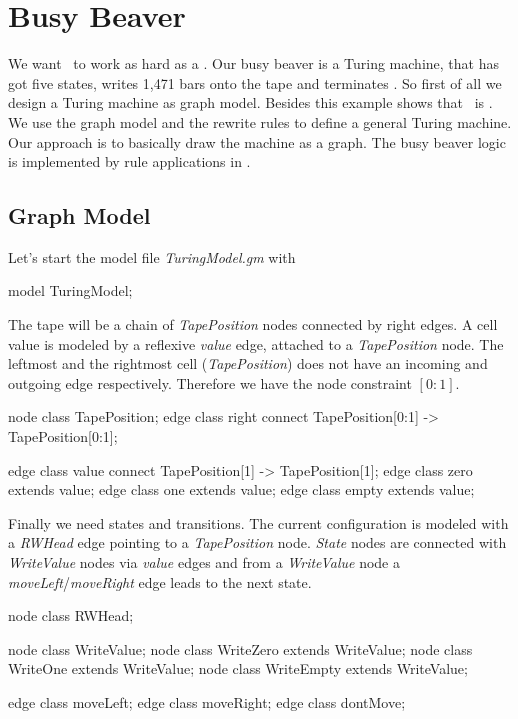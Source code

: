 \section{Busy Beaver}
We want \GrG\ to work as hard as a  \cite{Kro:07,Dew:84}. Our busy beaver is a Turing machine, that has got five states, writes 1,471 bars onto the tape and terminates \cite{MB:00}. So first of all we design a Turing machine as graph model. Besides this example shows that \GrG\ is . \\
We use the graph model and the rewrite rules to define a general Turing machine. Our approach is to basically draw the machine as a graph. The busy beaver logic is implemented by rule applications in \GrShell.

\subsection{Graph Model}
Let's start the model file \emph{TuringModel.gm} with
\begin{grgen}[firstnumber=1]
model TuringModel; 

\end{grgen}

The tape will be a chain of \emph{TapePosition} nodes connected by right edges. A cell value is modeled by a reflexive \emph{value} edge, attached to a \emph{TapePosition} node. The leftmost and the rightmost cell (\emph{TapePosition}) does not have an incoming and outgoing edge respectively. Therefore we have the node constraint $[0:1]$.
\begin{grgen}[firstnumber=last]
node class TapePosition; 
edge class right
  connect TapePosition[0:1] -> TapePosition[0:1];
  
edge class value
  connect TapePosition[1] -> TapePosition[1];  
edge class zero extends value;
edge class one extends value;
edge class empty extends value;

\end{grgen}
Finally we need states and transitions. The current configuration is modeled with a \emph{RWHead} edge pointing to a \emph{TapePosition} node. \emph{State} nodes are connected with \emph{WriteValue} nodes via \emph{value} edges and from a \emph{WriteValue} node a \emph{moveLeft}/\emph{moveRight} edge leads to the next state.
\begin{grgen}[firstnumber=last]
node class RWHead;

node class WriteValue;
node class WriteZero extends WriteValue;
node class WriteOne extends WriteValue;
node class WriteEmpty extends WriteValue; 

edge class moveLeft;
edge class moveRight;
edge class dontMove;

\end{grgen}

